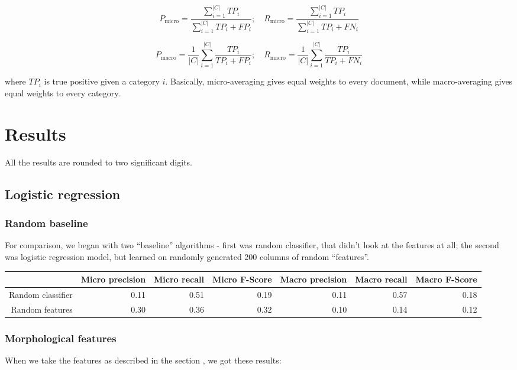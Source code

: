 \documentclass[letterpaper]{article}
\begin{document}
$$P_{\mathrm{micro}} = \frac{\sum_{i=1}^{|C|}TP_{i}}{\sum_{i=1}^{|C|}TP_{i}+FP_{i}}; \quad R_{\mathrm{micro}} = \frac{\sum_{i=1}^{|C|}TP_{i}}{\sum_{i=1}^{|C|}TP_{i}+FN_{i}}$$

$$P_{\mathrm{macro}}=\frac{1}{|C|}\sum_{i=1}^{|C|}\frac{TP_{i}}{TP_{i}+FP_{i}};\quad R_{\mathrm{macro}}=\frac{1}{|C|}\sum_{i=1}^{|C|}\frac{TP_{i}}{TP_{i}+FN_{i}}$$

where $TP_i$ is true positive given a category $i$. Basically, micro-averaging gives equal weights to every document, while macro-averaging gives equal weights to every category.

\section{Results}
All the results are rounded to two significant digits.
\subsection{Logistic regression}
\subsubsection{Random baseline}

For comparison, we began with two ``baseline'' algorithms - first was random classifier, that didn't look at the features at all; the second was logistic regression model, but learned on randomly generated 200 columns of random ``features''.

\begin{tabular}{|r|r|r|r|r|r|r|}
 \hline
 & \textbf{Micro precision} &  \textbf{Micro recall}  &  \textbf{Micro F-Score} & \textbf{Macro precision} &  \textbf{Macro recall}  &  \textbf{Macro F-Score} \\ \hline
Random classifier & 0.11 & 0.51 & 0.19 & 0.11 & 0.57 & 0.18 \\ \hline
Random features & 0.30 & 0.36 & 0.32 & 0.10 & 0.14 & 0.12 \\ \hline
\end{tabular}

\subsubsection{Morphological features}
When we take the features as described in the section , we got these results:
\end{document}
